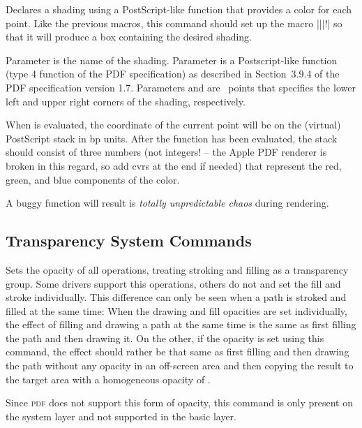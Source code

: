 \begin{command}{\pgfsys@functionalshading{}}
    Declares a shading using a PostScript-like function that provides a color
    for each point. Like the previous macros, this command should set up the
    macro |\@pgfshading||!| so that it will produce a box containing
    the desired shading.

    Parameter  is the name of the shading. Parameter  is a Postscript-like function (type 4 function of the PDF
    specification) as described in Section~3.9.4 of the PDF specification
    version 1.7. Parameters  and  are \pgfname\ points that specifies the lower left and upper right
    corners of the shading, respectively.

    When  is evaluated, the coordinate of the current
    point will be on the (virtual) PostScript stack in bp units. After the
    function has been evaluated, the stack should consist of three numbers (not
    integers! -- the Apple PDF renderer is broken in this regard, so add cvrs
    at the end if needed) that represent the red, green, and blue components of
    the color.

    A buggy function will result is \emph{totally unpredictable chaos} during
    rendering.
\end{command}


\subsection{Transparency System Commands}

\begin{command}{\pgfsys@opacity{}}
    Sets the opacity of all operations, treating stroking and filling as a
    transparency group. Some drivers support this operations, others do not and
    set the fill and stroke individually. This difference can only be seen when
    a path is stroked and filled at the same time: When the drawing and fill
    opacities are set individually, the effect of filling and drawing a path at
    the same time is the same as first filling the path and then drawing it. On
    the other, if the opacity is set using this command, the effect should
    rather be that same as first filling and then drawing the path without any
    opacity in an off-screen area and then copying the result to the target
    area with a homogeneous opacity of .

    Since \textsc{pdf} does not support this form of opacity, this command is
    only present on the system layer and not supported in the basic layer.
\end{command}

